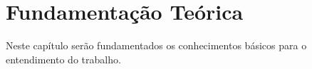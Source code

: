 \chapter{Fundamentação Teórica}
\label{ch:fundamentacao}
\par Neste capítulo ser\~ao fundamentados os conhecimentos b\'asicos para o entendimento do trabalho.
